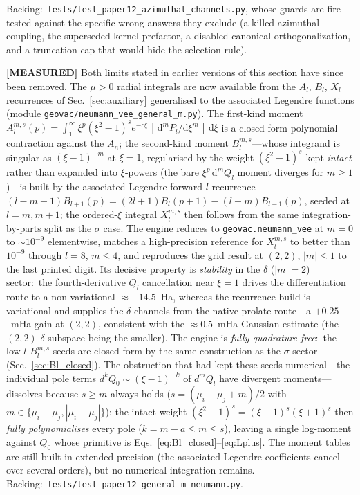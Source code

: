 \documentclass[aps,pra,twocolumn,superscriptaddress,longbibliography]{revtex4-2}
\begin{document}
Backing:\ \texttt{tests/test\_paper12\_azimuthal\_channels.py},
whose guards are fire-tested against the specific wrong answers they
exclude (a killed azimuthal coupling, the superseded kernel prefactor,
a disabled canonical orthogonalization, and a truncation cap that would
hide the selection rule).

\textbf{[MEASURED]} Both limits stated in earlier versions of this
section have since been removed.  The $\mu > 0$ radial integrals are
now available from the $A_l$, $B_l$, $X_l$ recurrences of
Sec.~\ref{sec:auxiliary} generalised to the associated Legendre
functions (module \texttt{geovac/neumann\_vee\_general\_m.py}).  The
first-kind moment $A_l^{m,s}(p) = \int_1^\infty \xi^p
(\xi^2-1)^s e^{-c\xi}\,[\,\mathrm{d}^m P_l/\mathrm{d}\xi^m\,]\,
\mathrm{d}\xi$ is a closed-form polynomial contraction against the
$A_n$; the second-kind moment $B_l^{m,s}$---whose integrand is
singular as $(\xi-1)^{-m}$ at $\xi = 1$, regularised by the weight
$(\xi^2-1)^s$ kept \emph{intact} rather than expanded into
$\xi$-powers (the bare $\xi^p\,\mathrm{d}^m Q_l$ moment diverges for
$m \ge 1$)---is built by the associated-Legendre forward $l$-recurrence
$(l-m+1)B_{l+1}(p) = (2l+1)B_l(p+1) - (l+m)B_{l-1}(p)$, seeded at
$l = m, m+1$; the ordered-$\xi$ integral $X_l^{m,s}$ then follows from
the same integration-by-parts split as the $\sigma$ case.  The engine
reduces to \texttt{geovac.neumann\_vee} at $m = 0$ to $\sim\!10^{-9}$
elementwise, matches a high-precision reference for $X_l^{m,s}$ to
better than $10^{-9}$ through $l = 8$, $m \le 4$, and reproduces the
grid result at $(2,2)$, $|m| \le 1$ to the last printed digit.  Its
decisive property is \emph{stability} in the $\delta$ ($|m| = 2$)
sector:\ the fourth-derivative $Q_l$ cancellation near $\xi = 1$ drives
the differentiation route to a non-variational $\approx -14.5$~Ha,
whereas the recurrence build is variational and supplies the $\delta$
channels from the native prolate route---a $+0.25$~mHa gain at
$(2,2)$, consistent with the $\approx 0.5$~mHa Gaussian estimate (the
$(2,2)$ $\delta$ subspace being the smaller).  The engine is
\emph{fully quadrature-free}:\ the low-$l$ $B_l^{m,s}$ seeds are
closed-form by the same construction as the $\sigma$ sector
(Sec.~\ref{sec:Bl_closed}).  The obstruction that had kept these seeds
numerical---the individual pole terms $d^{k}Q_0 \sim (\xi-1)^{-k}$ of
$d^m Q_l$ have divergent moments---dissolves because $s \ge m$ always
holds ($s = (\mu_i+\mu_j+m)/2$ with $m \in \{\mu_i+\mu_j,
|\mu_i-\mu_j|\}$): the intact weight
$(\xi^2-1)^s = (\xi-1)^s(\xi+1)^s$ then \emph{fully polynomialises}
every pole ($k = m-a \le m \le s$), leaving a single log-moment against
$Q_0$ whose primitive is Eqs.~\eqref{eq:Bl_closed}--\eqref{eq:Lplus}.
The moment tables are still built in extended precision (the associated
Legendre coefficients cancel over several orders), but no numerical
integration remains.  Backing:\
\texttt{tests/test\_paper12\_general\_m\_neumann.py}.
\end{document}

